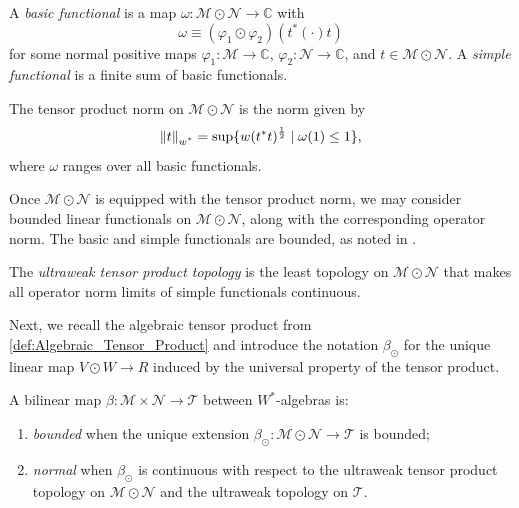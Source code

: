 \begin{definition}
  A \emph{basic functional} is a map $\omega: \mathscr{M} \odot \mathscr{N} \to \mathbb{C}$ with
\[
\omega \equiv (\varphi_1 \odot \varphi_2)(t^{*}(\cdot)t)
\]
for some normal positive maps $\varphi_1: \mathscr{M} \to \mathbb{C}$, $\varphi_2: \mathscr{N} \to \mathbb{C}$, and $t \in \mathscr{M} \odot \mathscr{N}$. A \emph{simple functional} is a finite sum of basic functionals.
\end{definition}

\begin{definition}
  The tensor product norm on $\mathscr{M} \odot \mathscr{N}$ is the norm  given by
\[
\left\lVert t \right\rVert_{\text{$w^*$}} = \sup \{ w(t^*t)^{\frac{1}{2}} \mid \omega(1) \leq 1 \},
\]
where $\omega$ ranges over all basic functionals.
\end{definition}


Once \( \mathscr{M} \odot \mathscr{N} \) is equipped with the tensor product norm, we may consider bounded linear functionals on $\mathscr{M} \odot \mathscr{N}$, along with the corresponding operator norm.  The basic and simple functionals are bounded, as noted in \cite[Definition 112 II (3)]{westerbaanCategoryNeumannAlgebras2019}.
\begin{definition}
The \emph{ultraweak tensor product topology} is the least topology on $\mathscr{M} \odot \mathscr{N}$
that makes all operator norm limits of simple functionals continuous.
\end{definition}

Next, we recall the algebraic tensor product from \autoref{def:Algebraic_Tensor_Product} and introduce the notation \( \beta_{\odot} \) for the unique linear map \( V \odot W \to R \) induced by the universal property of the tensor product.

\begin{definition}
A bilinear map $\beta\colon \mathscr{M}  \times \mathscr{N} \to \mathscr{T}$ between $W^*$-algebras is:
\begin{enumerate}
    \item \emph{bounded} when the unique extension $\beta_\odot\colon \mathscr{M} \odot \mathscr{N} \to \mathscr{T}$ is bounded;
    \item \emph{normal} when $\beta_\odot$ is continuous with respect to the ultraweak tensor product topology on $\mathscr{M} \odot \mathscr{N}$ and the ultraweak topology on $\mathscr{T}$.
\end{enumerate}
\end{definition}

